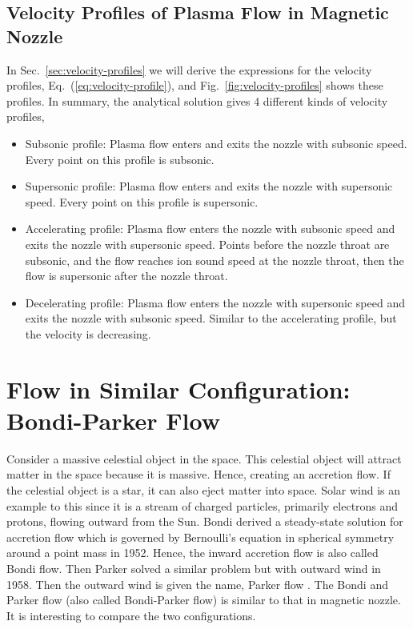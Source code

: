 \subsection{Velocity Profiles of Plasma Flow in Magnetic Nozzle}
In Sec.~\ref{sec:velocity-profiles} we will derive the expressions for the velocity profiles, Eq.~(\ref{eq:velocity-profile}), and Fig.~\ref{fig:velocity-profiles} shows these profiles. In summary, the analytical solution gives 4 different kinds of velocity profiles,
\begin{itemize}
	\item Subsonic profile: Plasma flow enters and exits the nozzle with subsonic speed. Every point on this profile is subsonic.
	\item Supersonic profile: Plasma flow enters and exits the nozzle with supersonic speed. Every point on this profile is supersonic.
	\item Accelerating profile: Plasma flow enters the nozzle with subsonic speed and exits the nozzle with supersonic speed. Points before the nozzle throat are subsonic, and the flow reaches ion sound speed at the nozzle throat, then the flow is supersonic after the nozzle throat.
	\item Decelerating profile: Plasma flow enters the nozzle with supersonic speed and exits the nozzle with subsonic speed. Similar to the accelerating profile, but the velocity is decreasing.
\end{itemize}

\section{Flow in Similar Configuration: Bondi-Parker Flow}
Consider a massive celestial object in the space. This celestial object will attract matter in the space because it is massive. Hence, creating an accretion flow. If the celestial object is a star, it can also eject matter into space. Solar wind is an example to this since it is a stream of charged particles, primarily electrons and protons, flowing outward from the Sun. Bondi derived a steady-state solution for accretion flow which is governed by Bernoulli's equation in spherical symmetry around a point mass in 1952. Hence, the inward accretion flow is also called Bondi flow. Then Parker solved a similar problem but with outward wind in 1958. Then the outward wind is given the name, Parker flow \cite{aikawa_stability_1979,bondi_spherically_1952,keto_stability_2020}. The Bondi and Parker flow (also called Bondi-Parker flow) is similar to that in magnetic nozzle. It is interesting to compare the two configurations.

